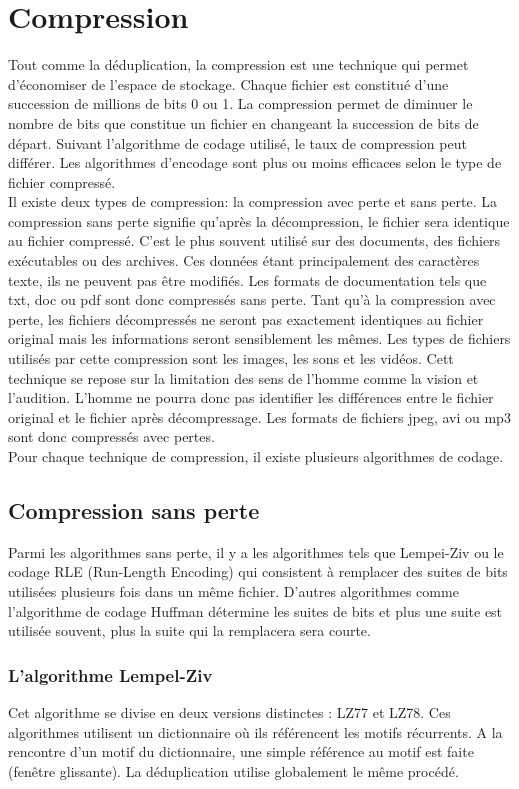 \documentclass[a4paper]{report}
\begin{document}
	\chapter{Compression}
	Tout comme la déduplication, la compression est une technique qui permet d'économiser de l'espace de stockage. Chaque fichier est constitué d'une succession de millions de bits 0 ou 1. La compression permet de diminuer le nombre de bits que constitue un fichier en changeant la succession de bits de départ. Suivant l'algorithme de codage utilisé, le taux de compression peut différer. Les algorithmes d'encodage sont plus ou moins efficaces selon le type de fichier compressé.\\
 Il existe deux types de compression: la compression avec perte et sans perte. La compression sans perte signifie qu'après la décompression, le fichier sera identique au fichier compressé. C'est le plus souvent utilisé sur des documents, des fichiers exécutables ou des archives. Ces données étant principalement des caractères texte, ils ne peuvent pas être modifiés. Les formats de documentation tels que txt, doc ou pdf sont donc compressés sans perte.  Tant qu'à la compression avec perte, les fichiers décompressés ne seront pas exactement identiques au fichier original mais les informations seront sensiblement les mêmes. Les types de fichiers utilisés par cette compression sont les images, les sons et les vidéos. Cett technique se repose sur la limitation des sens de l'homme comme la vision et l'audition. L'homme ne pourra donc pas identifier les différences entre le fichier original et le fichier après décompressage. Les formats de fichiers jpeg, avi ou mp3 sont donc compressés avec pertes. \\
Pour chaque technique de compression, il existe plusieurs algorithmes de codage.\\
	\section{Compression sans perte}
	Parmi les algorithmes sans perte, il y a les algorithmes tels que Lempei-Ziv ou le codage RLE (Run-Length Encoding) qui consistent à remplacer des suites de bits utilisées plusieurs fois dans un même fichier. D'autres algorithmes comme l'algorithme de codage Huffman détermine les suites de bits et plus une suite est utilisée souvent, plus la suite qui la remplacera sera courte.
	\subsection{L'algorithme Lempel-Ziv}
		Cet algorithme se divise en deux versions distinctes : LZ77 et LZ78. Ces algorithmes utilisent un dictionnaire où ils référencent les motifs récurrents. A la rencontre d'un motif du dictionnaire, une simple référence au motif est faite (fenêtre glissante). La déduplication utilise globalement le même procédé.\\
\end{document}
